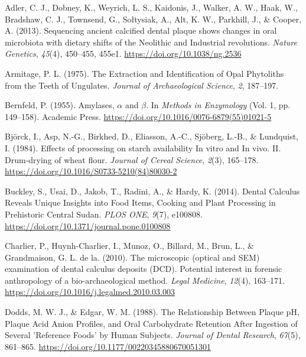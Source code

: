 \documentclass[
  b5paper,
]{book}
\newlength{\cslhangindent}
\newenvironment{CSLReferences}[2] %
 {\begin{list}{}{%
  \setlength{\itemindent}{0pt}
  \setlength{\leftmargin}{0pt}
  \setlength{\parsep}{0pt}
  \ifodd #1
   \setlength{\leftmargin}{\cslhangindent}
   \setlength{\itemindent}{-1\cslhangindent}
  \fi
  \setlength{\itemsep}{#2\baselineskip}}}
 {\end{list}}
\begin{document}
\label{refs-4}
\begin{CSLReferences}{1}{0}
Adler, C. J., Dobney, K., Weyrich, L. S., Kaidonis, J., Walker, A. W.,
Haak, W., Bradshaw, C. J., Townsend, G., Sołtysiak, A., Alt, K. W.,
Parkhill, J., \& Cooper, A. (2013). Sequencing ancient calcified dental
plaque shows changes in oral microbiota with dietary shifts of the
{Neolithic} and {Industrial} revolutions. \emph{Nature Genetics},
\emph{45}(4), 450--455, 455e1. \url{https://doi.org/10.1038/ng.2536}

Armitage, P. L. (1975). The {Extraction} and {Identification} of {Opal
Phytoliths} from the {Teeth} of {Ungulates}. \emph{Journal of
Archaeological Science}, \emph{2}, 187--197.

Bernfeld, P. (1955). Amylases, {\(\alpha\)} and {\(\beta\)}. In
\emph{Methods in {Enzymology}} (Vol. 1, pp. 149--158). {Academic Press}.
\url{https://doi.org/10.1016/0076-6879(55)01021-5}

Björck, I., Asp, N.-G., Birkhed, D., Eliasson, A.-C., Sjöberg, L.-B., \&
Lundquist, I. (1984). Effects of processing on starch availability {In}
vitro and {In} vivo. {II}. {Drum-drying} of wheat flour. \emph{Journal
of Cereal Science}, \emph{2}(3), 165--178.
\url{https://doi.org/10.1016/S0733-5210(84)80030-2}

Buckley, S., Usai, D., Jakob, T., Radini, A., \& Hardy, K. (2014).
Dental {Calculus Reveals Unique Insights} into {Food Items}, {Cooking}
and {Plant Processing} in {Prehistoric Central Sudan}. \emph{PLOS ONE},
\emph{9}(7), e100808. \url{https://doi.org/10.1371/journal.pone.0100808}

Charlier, P., Huynh-Charlier, I., Munoz, O., Billard, M., Brun, L., \&
Grandmaison, G. L. de la. (2010). The microscopic (optical and {SEM})
examination of dental calculus deposits ({DCD}). {Potential} interest in
forensic anthropology of a bio-archaeological method. \emph{Legal
Medicine}, \emph{12}(4), 163--171.
\url{https://doi.org/10.1016/j.legalmed.2010.03.003}

Dodds, M. W. J., \& Edgar, W. M. (1988). The {Relationship Between
Plaque pH}, {Plaque Acid Anion Profiles}, and {Oral Carbohydrate
Retention After Ingestion} of {Several} '{Reference Foods}' by {Human
Subjects}. \emph{Journal of Dental Research}, \emph{67}(5), 861--865.
\url{https://doi.org/10.1177/00220345880670051301}


\end{CSLReferences}
\end{document}
